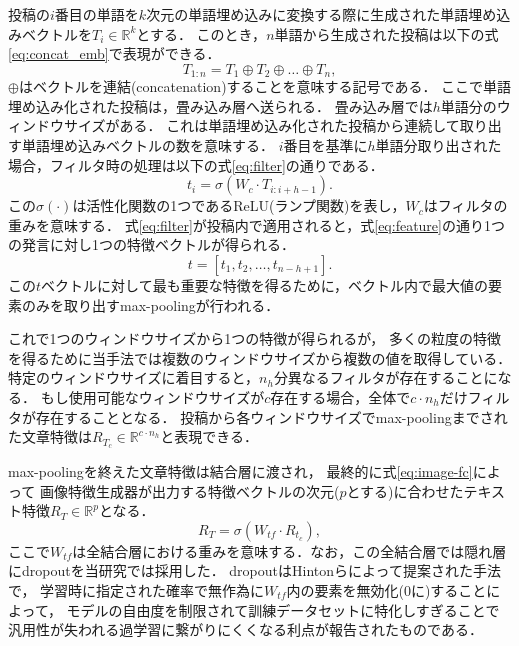 投稿の$i$番目の単語を$k$次元の単語埋め込みに変換する際に生成された単語埋め込みベクトルを$T_i \in \mathbb{R}^k$とする．
このとき，$n$単語から生成された投稿は以下の式\ref{eq:concat_emb}で表現ができる．
\begin{equation}
    \label{eq:concat_emb}
    T_{1:n} = T_1 \oplus T_2 \oplus \ldots \oplus T_n,
\end{equation}
$\oplus$はベクトルを連結(concatenation)することを意味する記号である．
ここで単語埋め込み化された投稿は，畳み込み層へ送られる．
畳み込み層では$h$単語分のウィンドウサイズがある．
これは単語埋め込み化された投稿から連続して取り出す単語埋め込みベクトルの数を意味する．
$i$番目を基準に$h$単語分取り出された場合，フィルタ時の処理は以下の式\ref{eq:filter}の通りである．
\begin{equation}
    \label{eq:filter}
    t_i = \sigma(W_c \cdot T_{i:i+h-1}).
\end{equation}
この$\sigma(\cdot)$は活性化関数の1つであるReLU(ランプ関数)を表し，$W_c$はフィルタの重みを意味する．
式\ref{eq:filter}が投稿内で適用されると，式\ref{eq:feature}の通り1つの発言に対し1つの特徴ベクトルが得られる．
\begin{equation}
    \label{eq:feature}
    t = [t_1, t_2, \ldots, t_{n-h+1}].
\end{equation}
この$t$ベクトルに対して最も重要な特徴を得るために，ベクトル内で最大値の要素のみを取り出すmax-poolingが行われる．

これで1つのウィンドウサイズから1つの特徴が得られるが，
多くの粒度の特徴を得るために当手法では複数のウィンドウサイズから複数の値を取得している．
特定のウィンドウサイズに着目すると，$n_h$分異なるフィルタが存在することになる．
もし使用可能なウィンドウサイズが$c$存在する場合，全体で$c \cdot n_h$だけフィルタが存在することとなる．
投稿から各ウィンドウサイズでmax-poolingまでされた文章特徴は$R_{T_c} \in \mathbb{R}^{c \cdot n_h}$と表現できる．

max-poolingを終えた文章特徴は結合層に渡され，
最終的に式\ref{eq:image-fc}によって
画像特徴生成器が出力する特徴ベクトルの次元($p$とする)に合わせたテキスト特徴$R_T \in \mathbb{R}^p$となる．
\begin{equation}
    \label{eq:image-fc}
    R_T = \sigma(W_{tf} \cdot R_{t_c}),
\end{equation}
ここで$W_{tf}$は全結合層における重みを意味する．なお，この全結合層では隠れ層にdropoutを当研究では採用した．
dropoutはHintonらによって提案された手法\cite{JMLR:v15:srivastava14a}で，
学習時に指定された確率で無作為に$W_{tf}$内の要素を無効化(0に)することによって，
モデルの自由度を制限されて訓練データセットに特化しすぎることで汎用性が失われる過学習に繋がりにくくなる利点が報告されたものである．
%
